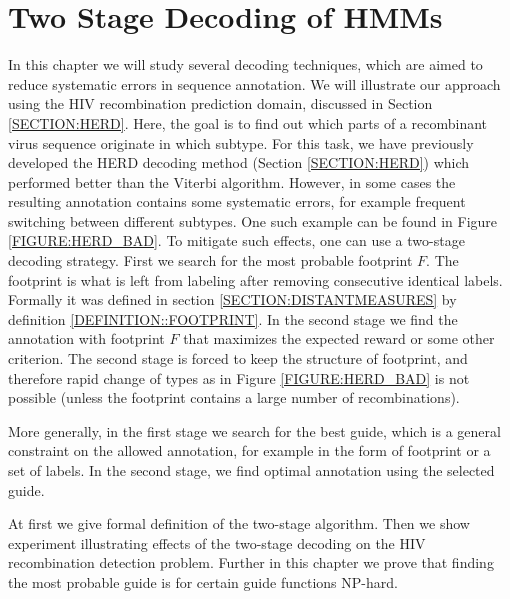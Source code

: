\chapter{Two Stage Decoding of HMMs}\label{CHAPTER:TWOSTAGE}

In this chapter we will study several decoding techniques, which are aimed to
reduce systematic errors in sequence annotation.  We will illustrate our
approach using the HIV recombination prediction domain, discussed in Section
\ref{SECTION:HERD}. Here, the goal is to find out which parts of a recombinant
virus sequence originate in which subtype.  For this task, we have previously
developed the HERD decoding method \cite{Nanasi2010, Nanasi2010mgr} (Section
\ref{SECTION:HERD}) which performed better than the Viterbi algorithm. However,
in some cases the resulting annotation contains some systematic errors, for
example frequent switching between different subtypes. One such example can be
found in Figure \ref{FIGURE:HERD_BAD}. To mitigate such effects, one can use a
two-stage decoding strategy. First we search for the most probable footprint
$F$. The footprint is what is left from labeling after removing consecutive
identical labels. Formally it was defined in section
\ref{SECTION:DISTANTMEASURES} by definition \ref{DEFINITION::FOOTPRINT}. In the
second stage we find the annotation with footprint $F$ that maximizes the
expected reward or some other criterion. The second stage is forced to keep the
structure of footprint, and therefore rapid change of types as in Figure
\ref{FIGURE:HERD_BAD} is not possible (unless the footprint contains a large
number of recombinations).

More generally, in the first stage we search for the best guide, which 
is a general constraint on the allowed annotation, for example in the form
of footprint or a set of labels. In the second stage, we find optimal
annotation using the selected guide.

At first we give formal definition of the two-stage algorithm. Then we show
experiment illustrating effects of the two-stage decoding on the HIV
recombination detection problem.  Further in this chapter we prove that finding
the most probable guide is for certain guide functions NP-hard.


